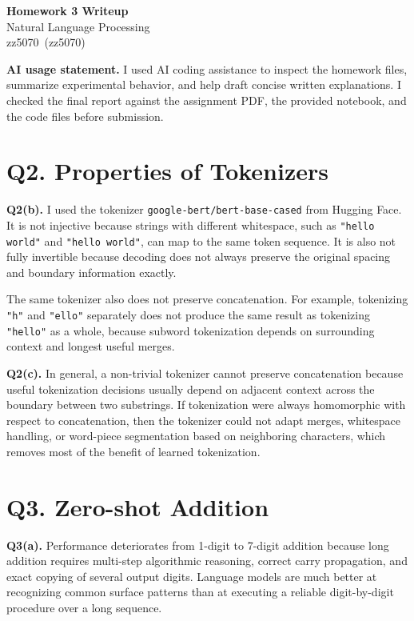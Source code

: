 \documentclass[11pt]{article}
\newcommand{\course}{Natural Language Processing}
\newcommand{\hw}{Homework 3 Writeup}
\newcommand{\studentname}{zz5070}
\newcommand{\netid}{zz5070}
\begin{document}
\begin{center}
    {\Large \textbf{\hw}}\\
    \course\\
    \studentname\ (\netid)
\end{center}

\textbf{AI usage statement.} I used AI coding assistance to inspect the homework files, summarize experimental behavior, and help draft concise written explanations. I checked the final report against the assignment PDF, the provided notebook, and the code files before submission.

\section*{Q2. Properties of Tokenizers}

\textbf{Q2(b).} I used the tokenizer \texttt{google-bert/bert-base-cased} from Hugging Face. It is not injective because strings with different whitespace, such as \texttt{"hello world"} and \texttt{"hello   world"}, can map to the same token sequence. It is also not fully invertible because decoding does not always preserve the original spacing and boundary information exactly.

The same tokenizer also does not preserve concatenation. For example, tokenizing \texttt{"h"} and \texttt{"ello"} separately does not produce the same result as tokenizing \texttt{"hello"} as a whole, because subword tokenization depends on surrounding context and longest useful merges.

\textbf{Q2(c).} In general, a non-trivial tokenizer cannot preserve concatenation because useful tokenization decisions usually depend on adjacent context across the boundary between two substrings. If tokenization were always homomorphic with respect to concatenation, then the tokenizer could not adapt merges, whitespace handling, or word-piece segmentation based on neighboring characters, which removes most of the benefit of learned tokenization.

\section*{Q3. Zero-shot Addition}

\textbf{Q3(a).} Performance deteriorates from 1-digit to 7-digit addition because long addition requires multi-step algorithmic reasoning, correct carry propagation, and exact copying of several output digits. Language models are much better at recognizing common surface patterns than at executing a reliable digit-by-digit procedure over a long sequence.
\end{document}
